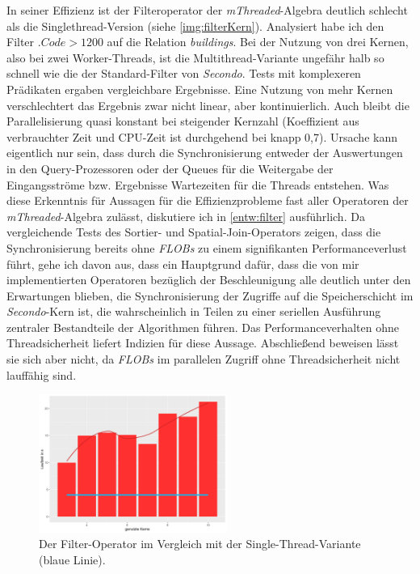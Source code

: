 \documentclass[a4paper,12pt,twoside]{article}
\newcommand{\Fb}[1]{\textit{#1}} %
\begin{document}
In seiner Effizienz ist der Filteroperator der \Fb{mThreaded}-Algebra deutlich schlecht als die Singlethread-Version (siehe \autoref{img:filterKern}). Analysiert habe ich den Filter $.Code > 1200$ auf die Relation \Fb{buildings}. Bei der Nutzung von drei Kernen, also bei zwei Worker-Threads, ist die Multithread-Variante ungefähr halb so schnell wie die der Standard-Filter von \Fb{Secondo}. Tests mit komplexeren Prädikaten ergaben vergleichbare Ergebnisse. Eine Nutzung von mehr Kernen verschlechtert das Ergebnis zwar nicht linear, aber kontinuierlich. Auch bleibt die Parallelisierung quasi konstant bei steigender Kernzahl (Koeffizient aus verbrauchter Zeit und CPU-Zeit ist durchgehend bei knapp 0,7). Ursache kann eigentlich nur sein, dass durch die Synchronisierung entweder der Auswertungen in den Query-Prozessoren oder der Queues für die Weitergabe der Eingangsströme bzw. Ergebnisse  Wartezeiten für die Threads entstehen. Was diese Erkenntnis für Aussagen für die Effizienzprobleme fast aller Operatoren der \Fb{mThreaded}-Algebra zulässt, diskutiere ich in \autoref{entw:filter} ausführlich. Da vergleichende Tests des Sortier- und Spatial-Join-Operators zeigen, dass die Synchronisierung bereits ohne \Fb{FLOBs} zu einem signifikanten Performanceverlust führt, gehe ich davon aus, dass ein Hauptgrund dafür, dass die von mir implementierten Operatoren bezüglich der Beschleunigung alle deutlich unter den Erwartungen blieben, die Synchronisierung der Zugriffe auf die Speicherschicht im \Fb{Secondo}-Kern ist, die wahrscheinlich in Teilen zu einer seriellen Ausführung zentraler Bestandteile der Algorithmen führen. Das Performanceverhalten ohne Threadsicherheit liefert Indizien für diese Aussage. Abschließend beweisen lässt sie sich aber nicht, da \Fb{FLOBs} im parallelen Zugriff ohne Threadsicherheit nicht lauffähig sind.  

\begin{figure}
	\centering
	\includegraphics[width=0.55\textwidth]{Bilder/filter_kerne.png}
	\caption{Der Filter-Operator im Vergleich mit der Single-Thread-Variante (blaue Linie).}
	\label{img:filterKern}
\end{figure}
\end{document}
